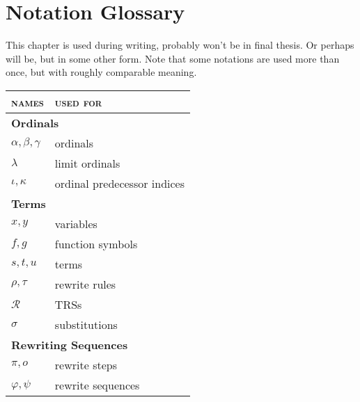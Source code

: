 \chapter{Notation Glossary}\label{chap:glossary}

This chapter is used during writing, probably won't be in final
thesis. Or perhaps will be, but in some other form. Note that some
notations are used more than once, but with roughly comparable
meaning.

{\renewcommand{\arraystretch}{1.1}
\renewcommand{\tabcolsep}{10pt}
\begin{tabular}{p{150pt} p{175pt}}
\textsc{names} & \textsc{used for}\\
\hline
\multicolumn{2}{l}{\bf Ordinals}\\
$\alpha, \beta, \gamma$ & ordinals\\
$\lambda$ & limit ordinals\\
$\iota, \kappa$ & ordinal predecessor indices\\
\multicolumn{2}{l}{\bf Terms}\\
$x, y$ & variables\\
$f, g$ & function symbols\\
$s, t, u$ & terms\\
$\rho, \tau$ & rewrite rules\\
$\mathcal{R}$ & TRSs\\
$\sigma$ & substitutions\\
\multicolumn{2}{l}{\bf Rewriting Sequences}\\
$\pi, o$ & rewrite steps\\
$\varphi, \psi$ & rewrite sequences\\
\end{tabular}}

